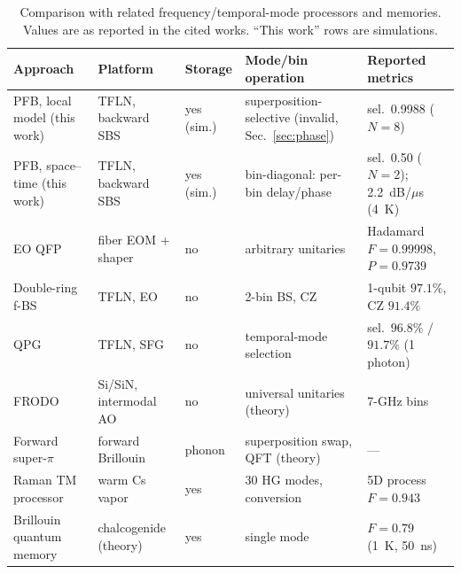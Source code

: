 \documentclass[reprint,amsmath,amssymb,aps,prapplied,superscriptaddress,floatfix]{revtex4-2}
\newcommand{\dBus}{dB/$\mu$s}
\begin{document}
\begin{table}[t]
\footnotesize
\caption{Comparison with related frequency/temporal-mode processors and memories. Values are as reported in the cited works. ``This work'' rows are simulations.}
\label{tab:compare}
\begin{ruledtabular}
\begin{tabular}{p{3.6cm}p{3.0cm}p{1.4cm}p{4.4cm}p{4.2cm}}
Approach & Platform & Storage & Mode/bin operation & Reported metrics\\ \hline
\raggedright PFB, local model (this work)&\raggedright TFLN, backward SBS&\raggedright yes (sim.)&\raggedright superposition-selective (invalid, Sec.~\ref{sec:phase})&\raggedright sel.\ 0.9988 ($N=8$)\tabularnewline
\raggedright PFB, space--time (this work)&\raggedright TFLN, backward SBS&\raggedright yes (sim.)&\raggedright bin-diagonal: per-bin delay/phase&\raggedright sel.\ 0.50 ($N=2$); 2.2~\dBus{} (4~K)\tabularnewline
\raggedright EO QFP~\cite{Lu2018PRL}&\raggedright fiber EOM + shaper&\raggedright no&\raggedright arbitrary unitaries&\raggedright Hadamard $F=0.99998$, $P=0.9739$\tabularnewline
\raggedright Double-ring f-BS~\cite{Yang2026QFP}&\raggedright TFLN, EO&\raggedright no&\raggedright 2-bin BS, CZ&\raggedright 1-qubit $97.1\%$, CZ $91.4\%$\tabularnewline
\raggedright QPG~\cite{Babel2026QPG}&\raggedright TFLN, SFG&\raggedright no&\raggedright temporal-mode selection&\raggedright sel.\ $96.8\%$ / $91.7\%$ (1 photon)\tabularnewline
\raggedright FRODO~\cite{Lukens2026FRODO}&\raggedright Si/SiN, intermodal AO&\raggedright no&\raggedright universal unitaries (theory)&\raggedright 7-GHz bins\tabularnewline
\raggedright Forward super-$\pi$~\cite{ShepherdBehunin2025}&\raggedright forward Brillouin&\raggedright phonon&\raggedright superposition swap, QFT (theory)&\raggedright ---\tabularnewline
\raggedright Raman TM processor~\cite{Zhang2026Raman}&\raggedright warm Cs vapor&\raggedright yes&\raggedright 30 HG modes, conversion&\raggedright 5D process $F=0.943$\tabularnewline
\raggedright Brillouin quantum memory~\cite{ZhuGenesStiller2026}&\raggedright chalcogenide (theory)&\raggedright yes&\raggedright single mode&\raggedright $F=0.79$ (1~K, 50~ns)\tabularnewline
\end{tabular}
\end{ruledtabular}
\end{table}

\end{document}

